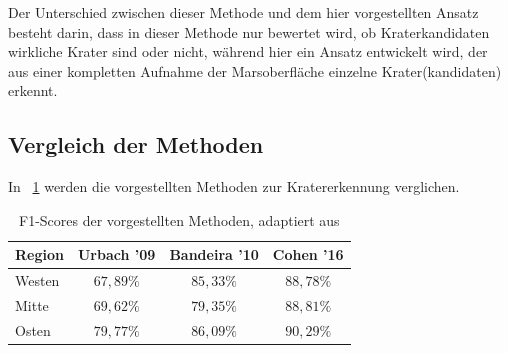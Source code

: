 Der Unterschied zwischen dieser Methode und dem hier vorgestellten Ansatz besteht darin, dass in dieser Methode nur bewertet wird, ob Kraterkandidaten wirkliche Krater sind oder nicht, während hier ein Ansatz entwickelt wird, der aus einer kompletten Aufnahme der Marsoberfläche einzelne Krater(kandidaten) erkennt.

\subsection{Vergleich der Methoden}
\label{ssec:comparision}

In \tablename~\ref{tab:comparision} werden die vorgestellten Methoden zur Kratererkennung verglichen.

\begin{table}[h!]
\centering
\begin{tabular}{l | c c c}%
	Region & Urbach '09 \cite{urbach2009automatic} & Bandeira '10 \cite{bandeira} & Cohen '16 \cite{crater_cnn}\\
	\hline
	Westen & $67,89\%$ & $85,33\%$ & $88,78\%$ \\
	Mitte & $69,62\%$ & $79,35\%$ & $88,81\%$ \\
	Osten & $79,77\%$ & $86,09\%$ & $90,29\%$ \\
\end{tabular}
\caption{F1-Scores der vorgestellten Methoden, adaptiert aus \cite{crater_cnn}}
\label{tab:comparision}
\end{table}